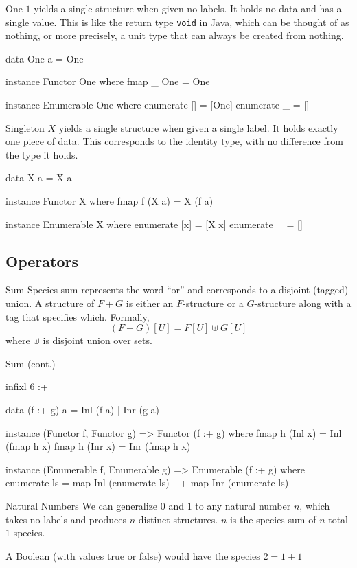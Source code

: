 \documentclass{beamer}
\begin{document}
\begin{frame}[fragile]{One}
  \( 1 \) yields a single structure when given no labels. It holds no data and has a single value.
  This is like the return type \verb|void| in Java,
  which can be thought of as nothing, or more precisely, a unit type that can always be created from
  nothing.
  \pause{}
  \vfill
  \begin{code}
data One a = One

instance Functor One where
  fmap _ One = One

instance Enumerable One where
  enumerate [] = [One]
  enumerate _ = []
  \end{code}
\end{frame}

\begin{frame}[fragile]{Singleton}
  \( X \) yields a single structure when given a single label. It holds exactly one piece of data.
  This corresponds to the identity type, with no difference from the type it holds.
  \pause{}
  \vfill
  \begin{code}
data X a = X a

instance Functor X where
  fmap f (X a) = X (f a)

instance Enumerable X where
  enumerate [x] = [X x]
  enumerate _ = []
  \end{code}
\end{frame}

\subsection{Operators}
\begin{frame}{Sum}
  Species sum represents the word ``or'' and corresponds to a disjoint (tagged) union.  A structure
  of \( F + G \) is either an \( F \)-structure or a \( G \)-structure along with a tag that
  specifies which. Formally,
  \[
    (F + G)[U] = F[U] \uplus G[U]
  \]
  where \( \uplus \) is disjoint union over sets.~\cite{yorgey}
\end{frame}
\begin{frame}[fragile]{Sum (cont.)}
  \begin{code}
infixl 6 :+

data (f :+ g) a = Inl (f a) | Inr (g a)

instance (Functor f, Functor g) => Functor (f :+ g) where
  fmap h (Inl x) = Inl (fmap h x)
  fmap h (Inr x) = Inr (fmap h x)

instance (Enumerable f, Enumerable g) => Enumerable (f :+ g) where
  enumerate ls = map Inl (enumerate ls) ++ map Inr (enumerate ls)
  \end{code}
\end{frame}
\begin{frame}{Natural Numbers}
  We can generalize \( 0 \) and \( 1 \) to any natural number \( n \), which takes no labels and
  produces \( n \) distinct structures.  \( n \) is the species sum of \( n \) total \( 1 \)
  species.
  \begin{exampleblock}{}
    A Boolean (with values true or false) would have the species \( 2 = 1 + 1 \)
  \end{exampleblock}
\end{frame}
\end{document}
